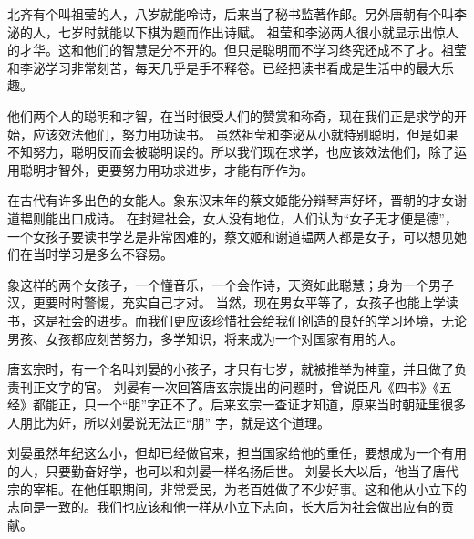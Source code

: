 \documentclass[avery5371,grid]{flashcards}
\begin{document}
{北齐有个叫祖莹的人，八岁就能呤诗，后来当了秘书监著作郎。另外唐朝有个叫李泌的人，七岁时就能以下棋为题而作出诗赋。} %
{祖莹和李泌两人很小就显示出惊人的才华。这和他们的智慧是分不开的。但只是聪明而不学习终究还成不了才。祖莹和李泌学习非常刻苦，每天几乎是手不释卷。已经把读书看成是生活中的最大乐趣。} %

{他们两个人的聪明和才智，在当时很受人们的赞赏和称奇，现在我们正是求学的开始，应该效法他们，努力用功读书。} %
{虽然祖莹和李泌从小就特别聪明，但是如果不知努力，聪明反而会被聪明误的。所以我们现在求学，也应该效法他们，除了运用聪明才智外，更要努力用功求进步，才能有所作为。} %

{在古代有许多出色的女能人。象东汉末年的蔡文姬能分辩琴声好坏，晋朝的才女谢道韫则能出口成诗。} %
{在封建社会，女人没有地位，人们认为“女子无才便是德”，一个女孩子要读书学艺是非常困难的，蔡文姬和谢道韫两人都是女子，可以想见她们在当时学习是多么不容易。} %

{象这样的两个女孩子，一个懂音乐，一个会作诗，天资如此聪慧；身为一个男子汉，更要时时警惕，充实自己才对。} %
{当然，现在男女平等了，女孩子也能上学读书，这是社会的进步。而我们更应该珍惜社会给我们创造的良好的学习环境，无论男孩、女孩都应刻苦努力，多学知识，将来成为一个对国家有用的人。} %

{唐玄宗时，有一个名叫刘晏的小孩子，才只有七岁，就被推举为神童，并且做了负责刊正文字的官。} %
{刘晏有一次回答唐玄宗提出的问题时，曾说臣凡《四书》《五经》都能正，只一个“朋”字正不了。后来玄宗一查证才知道，原来当时朝延里很多人朋比为奸，所以刘晏说无法正“朋” 字，就是这个道理。} %

{刘晏虽然年纪这么小，但却已经做官来，担当国家给他的重任，要想成为一个有用的人，只要勤奋好学，也可以和刘晏一样名扬后世。} %
{刘晏长大以后，他当了唐代宗的宰相。在他任职期间，非常爱民，为老百姓做了不少好事。这和他从小立下的志向是一致的。我们也应该和他一样从小立下志向，长大后为社会做出应有的贡献。} %
\end{document}
